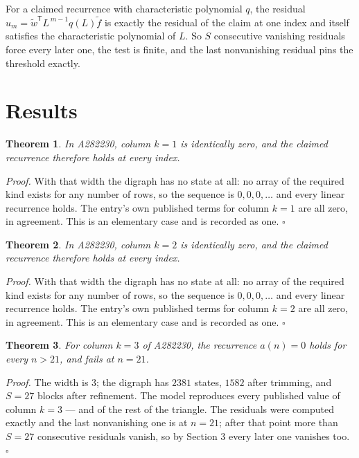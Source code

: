 \documentclass[11pt]{article}
\newtheorem{theorem}{Theorem}
\theoremstyle{definition}
\begin{document}
For a claimed recurrence with characteristic polynomial $q$, the residual $u_m = \tilde w^{\mathsf T}L^{\,m-1}q(L)\tilde f$ is exactly the residual of the claim at one index and itself satisfies the characteristic polynomial of $L$. So $S$ consecutive vanishing residuals force every later one, the test is finite, and the last nonvanishing residual pins the threshold exactly.

\section{Results}

\begin{theorem} In A282230, column $k = 1$ is identically zero, and the claimed recurrence therefore holds at every index.\end{theorem}

{\itshape Proof.} With that width the digraph has no state at all: no array of the required kind exists for any number of rows, so the sequence is $0,0,0,\dots$ and every linear recurrence holds. The entry's own published terms for column $k = 1$ are all zero, in agreement. This is an elementary case and is recorded as one. $\square$

\begin{theorem} In A282230, column $k = 2$ is identically zero, and the claimed recurrence therefore holds at every index.\end{theorem}

{\itshape Proof.} With that width the digraph has no state at all: no array of the required kind exists for any number of rows, so the sequence is $0,0,0,\dots$ and every linear recurrence holds. The entry's own published terms for column $k = 2$ are all zero, in agreement. This is an elementary case and is recorded as one. $\square$

\begin{theorem} For column $k = 3$ of A282230, the recurrence $a(n) = 0$ holds for every $n > 21$, and fails at $n = 21$.\end{theorem}

{\itshape Proof.} The width is $3$; the digraph has $2381$ states, $1582$ after trimming, and $S = 27$ blocks after refinement. The model reproduces every published value of column $k = 3$ --- and of the rest of the triangle. The residuals were computed exactly and the last nonvanishing one is at $n = 21$; after that point more than $S = 27$ consecutive residuals vanish, so by Section 3 every later one vanishes too. $\square$
\end{document}
